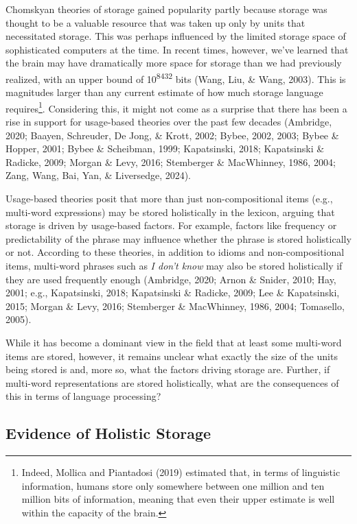 \documentclass[
  man,floatsintext]{apa6}
\begin{document}
Chomskyan theories of storage gained popularity partly because storage was thought to be a valuable resource that was taken up only by units that necessitated storage. This was perhaps influenced by the limited storage space of sophisticated computers at the time. In recent times, however, we've learned that the brain may have dramatically more space for storage than we had previously realized, with an upper bound of 10\textsuperscript{8432} bits (Wang, Liu, \& Wang, 2003). This is magnitudes larger than any current estimate of how much storage language requires\footnote{Indeed, Mollica and Piantadosi (2019) estimated that, in terms of linguistic information, humans store only somewhere between one million and ten million bits of information, meaning that even their upper estimate is well within the capacity of the brain.}. Considering this, it might not come as a surprise that there has been a rise in support for usage-based theories over the past few decades (Ambridge, 2020; Baayen, Schreuder, De Jong, \& Krott, 2002; Bybee, 2002, 2003; Bybee \& Hopper, 2001; Bybee \& Scheibman, 1999; Kapatsinski, 2018; Kapatsinski \& Radicke, 2009; Morgan \& Levy, 2016; Stemberger \& MacWhinney, 1986, 2004; Zang, Wang, Bai, Yan, \& Liversedge, 2024).

Usage-based theories posit that more than just non-compositional items (e.g., multi-word expressions) may be stored holistically in the lexicon, arguing that storage is driven by usage-based factors. For example, factors like frequency or predictability of the phrase may influence whether the phrase is stored holistically or not. According to these theories, in addition to idioms and non-compositional items, multi-word phrases such as \emph{I don't know} may also be stored holistically if they are used frequently enough (Ambridge, 2020; Arnon \& Snider, 2010; Hay, 2001; e.g., Kapatsinski, 2018; Kapatsinski \& Radicke, 2009; Lee \& Kapatsinski, 2015; Morgan \& Levy, 2016; Stemberger \& MacWhinney, 1986, 2004; Tomasello, 2005).

While it has become a dominant view in the field that at least some multi-word items are stored, however, it remains unclear what exactly the size of the units being stored is and, more so, what the factors driving storage are. Further, if multi-word representations are stored holistically, what are the consequences of this in terms of language processing?

\subsection{Evidence of Holistic Storage}\label{evidence-of-holistic-storage}
\end{document}
